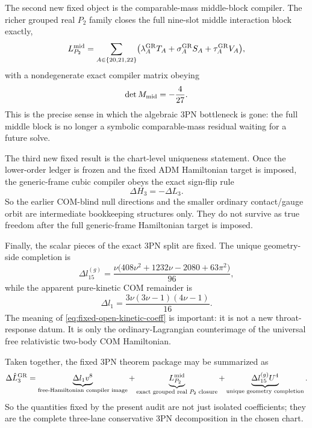\documentclass[11pt]{article}
\begin{document}
The second new fixed object is the comparable-mass middle-block compiler.  The
richer grouped real $P_2$ family closes the full nine-slot middle interaction
block exactly,
\begin{equation}
L_{P_2}^{\rm mid}
=
\sum_{A\in\{20,21,22\}}
\bigl(
\lambda_A^{\rm GR}T_A+\sigma_A^{\rm GR}S_A+\tau_A^{\rm GR}V_A
\bigr),
\label{eq:fixed-open-grouped-closure}
\end{equation}
with a nondegenerate exact compiler matrix obeying
\begin{equation}
\det M_{\rm mid}=-\frac4{27}.
\label{eq:fixed-open-det-mid}
\end{equation}
This is the precise sense in which the algebraic $3$PN bottleneck is gone: the
full middle block is no longer a symbolic comparable-mass residual waiting for a
future solve.

The third new fixed result is the chart-level uniqueness statement.  Once the
lower-order ledger is frozen and the fixed ADM Hamiltonian target is imposed,
the generic-frame cubic compiler obeys the exact sign-flip rule
\begin{equation}
\Delta H_3=-\Delta L_3.
\label{eq:fixed-open-signflip}
\end{equation}
So the earlier COM-blind null directions and the smaller ordinary contact/gauge
orbit are intermediate bookkeeping structures only.  They do not survive as
true freedom after the full generic-frame Hamiltonian target is imposed.

Finally, the scalar pieces of the exact $3$PN split are fixed.  The unique
geometry-side completion is
\begin{equation}
\Delta l_{15}^{(g)}
=
\frac{\nu\bigl(408\nu^2+1232\nu-2080+63\pi^2\bigr)}{96},
\label{eq:fixed-open-geometry-coeff}
\end{equation}
while the apparent pure-kinetic COM remainder is
\begin{equation}
\Delta l_1
=
\frac{3\nu(3\nu-1)(4\nu-1)}{16}.
\label{eq:fixed-open-kinetic-coeff}
\end{equation}
The meaning of \eqref{eq:fixed-open-kinetic-coeff} is important: it is not a new
throat-response datum.  It is only the ordinary-Lagrangian counterimage of the
universal free relativistic two-body COM Hamiltonian.

Taken together, the fixed $3$PN theorem package may be summarized as
\begin{equation}
\Delta \hat L_3^{\rm GR}
=
\underbrace{\Delta l_1 v^8}_{\text{free-Hamiltonian compiler image}}
+
\underbrace{L_{P_2}^{\rm mid}}_{\text{exact grouped real }P_2\text{ closure}}
+
\underbrace{\Delta l_{15}^{(g)}U^4}_{\text{unique geometry completion}}.
\label{eq:fixed-open-final-split}
\end{equation}
So the quantities fixed by the present audit are not just isolated coefficients;
they are the complete three-lane conservative $3$PN decomposition in the chosen
chart.
\end{document}
